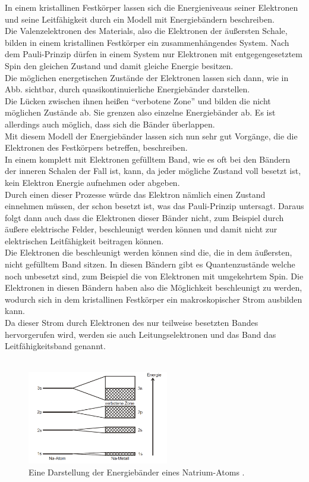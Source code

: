 In einem kristallinen Festkörper lassen sich die Energieniveaus seiner Elektronen und seine Leitfähigkeit durch
ein Modell mit Energiebändern beschreiben.\\
Die Valenzelektronen des Materials, also die Elektronen der äußersten Schale, 
bilden in einem kristallinen Festkörper ein zusammenhängendes System. Nach dem Pauli-Prinzip dürfen in einem System nur Elektronen mit entgegengesetztem Spin
den gleichen Zustand und damit gleiche Energie besitzen.\\
Die möglichen energetischen Zustände der Elektronen lassen sich dann, wie in Abb. sichtbar,
durch quasikontinuierliche Energiebänder darstellen.\\
Die Lücken zwischen ihnen heißen \enquote{verbotene Zone} und bilden die nicht möglichen Zustände ab. Sie grenzen also einzelne Energiebänder ab.
Es ist allerdings auch möglich, dass sich die Bänder überlappen.\\
Mit diesem Modell der Energiebänder lassen sich nun sehr gut Vorgänge, die die Elektronen des Festkörpers betreffen, beschreiben.\\
In einem komplett mit Elektronen gefülltem Band, wie es oft bei den Bändern der inneren 
Schalen der Fall ist, kann, da jeder mögliche Zustand voll besetzt ist,
kein Elektron Energie aufnehmen oder abgeben. \\
Durch einen dieser Prozesse würde das Elektron nämlich einen Zustand einnehmen müssen, der schon besetzt ist, was das Pauli-Prinzip untersagt.
Daraus folgt dann auch dass die Elektronen dieser Bänder nicht, zum Beispiel durch äußere elektrische Felder, beschleunigt werden können 
und damit nicht zur elektrischen Leitfähigkeit beitragen können.\\
Die Elektronen die beschleunigt werden können sind die, die in dem äußersten, nicht gefülltem Band sitzen.
In diesen Bändern gibt es Quantenzustände welche noch unbesetzt sind, zum Beispiel die von Elektronen mit umgekehrtem Spin.
Die Elektronen in diesen Bändern haben also die Möglichkeit beschleunigt zu werden, wodurch sich in dem kristallinen Festkörper
ein makroskopischer Strom ausbilden kann.\\
Da dieser Strom durch Elektronen des nur teilweise besetzten Bandes hervorgerufen wird, werden sie auch Leitungselektronen und das Band das Leitfähigkeitsband genannt.\\\\

\begin{figure}[H]
  \centering
  \includegraphics[width=0.55\textwidth]{images/energiebaender.PNG}
  \caption{Eine Darstellung der Energiebänder eines Natrium-Atoms \protect \cite{V311}.}
  \label{img:band}
\end{figure}

